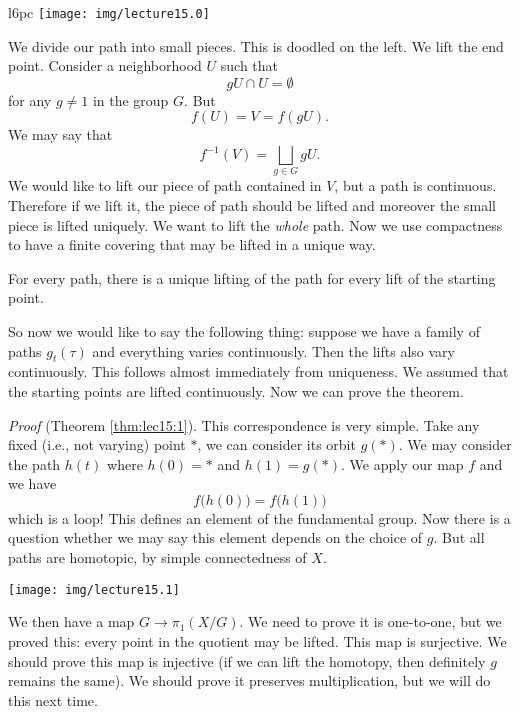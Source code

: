 \begin{wrapfigure}{l}{6pc}
  \vspace{-12pt}
  \centering
  \texttt{[image: img/lecture15.0]}
\end{wrapfigure}
\noindent\ignorespaces
We divide our path into small pieces. This is doodled on the left.
We lift the end point.
Consider a neighborhood $U$ such that
\begin{equation}
gU\cap U=\emptyset
\end{equation}
for any $g\not=1$ in the group $G$. But 
\begin{equation}
f(U)=V=f(gU).
\end{equation}
We may say that
\begin{equation}
f^{-1}(V)=\bigsqcup_{g\in G}gU.
\end{equation}
We would like to lift our piece of path contained in $V$, but a
path is continuous. Therefore if we lift it, the piece of path
should be lifted and moreover the small piece is lifted
uniquely. We want to lift the \emph{whole} path. Now we use
compactness to have a finite covering that may be lifted in a
unique way.

\begin{lem}
For every path, there is a unique lifting of the path for every
lift of the starting point.
\end{lem}

So now we would like to say the following thing: suppose we have
a family of paths $g_{t}(\tau)$ and everything varies
continuously. Then the lifts also vary continuously. This
follows almost immediately from uniqueness. We assumed that the
starting points are lifted continuously. Now we can prove the
theorem.

\medbreak\noindent\emph{Proof} (Theorem \ref{thm:lec15:1}).\quad%
This correspondence is very simple. Take any fixed (i.e., not
varying) point $*$, we can consider its orbit $g(*)$. We may
consider the path $h(t)$ where $h(0)=*$ and $h(1)=g(*)$. We apply
our map $f$ and we have
\begin{equation}
f\bigl(h(0)\bigr)=f\bigl(h(1)\bigr)
\end{equation}
which is a loop!
This defines an element of the fundamental group. Now there is a
question whether we may say this element depends on the choice of
$g$. But all paths are homotopic, by simple connectedness of $X$.

\begin{center}
\texttt{[image: img/lecture15.1]}
\end{center}
We then have a map $G\to\pi_{1}(X/G)$. We need to prove it is
one-to-one, but we proved this: every point in the quotient may
be lifted. This map is surjective. We should prove this map is
injective (if we can lift the homotopy, then definitely $g$
remains the same). We should prove it preserves multiplication,
but we will do this next time.

